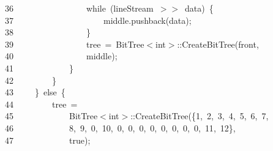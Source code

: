 \documentclass[11pt,a4paper]{ctexart}
\newcommand{\hlstd}[1]{\textcolor[rgb]{0.2,0.2,0.2}{#1}}
\newcommand{\hlnum}[1]{\textcolor[rgb]{0.06,0.58,0.63}{#1}}
\newcommand{\hlopt}[1]{\textcolor[rgb]{0.2,0.2,0.2}{#1}}
\newcommand{\hllin}[1]{\textcolor[rgb]{0.59,0.59,0.59}{#1}}
\newcommand{\hlkwa}[1]{\textcolor[rgb]{0.23,0.42,0.78}{#1}}
\newcommand{\hlkwb}[1]{\textcolor[rgb]{0.63,0,0.31}{#1}}
\newcommand{\hlkwd}[1]{\textcolor[rgb]{0.78,0.23,0.41}{#1}}
\begin{document}
\hllin{36\ }\hlstd{}\hlstd{\ \ \ \ \ \ \ \ \ \ \ \ \ \ \ \ }\hlstd{}\hlkwa{while\ }\hlstd{}\hlopt{(}\hlstd{lineStream\ }\hlopt{$>$$>$\ }\hlstd{data}\hlopt{)\ \{}\\
\hllin{37\ }\hlstd{}\hlstd{\ \ \ \ \ \ \ \ \ \ \ \ \ \ \ \ \ \ \ \ }\hlstd{middle}\hlopt{.}\hlstd{}\hlkwd{push\textunderscore back}\hlstd{}\hlopt{(}\hlstd{data}\hlopt{);}\\
\hllin{38\ }\hlstd{}\hlstd{\ \ \ \ \ \ \ \ \ \ \ \ \ \ \ \ }\hlstd{}\hlopt{\}}\\
\hllin{39\ }\hlstd{}\hlstd{\ \ \ \ \ \ \ \ \ \ \ \ \ \ \ \ }\hlstd{tree\ }\hlopt{=\ }\hlstd{BitTree}\hlopt{$<$}\hlstd{}\hlkwb{int}\hlstd{}\hlopt{$>$::}\hlstd{}\hlkwd{CreateBitTree}\hlstd{}\hlopt{(}\hlstd{front}\hlopt{,\ }\Righttorque\\
\hllin{40\ }\hlstd{}\hlstd{\ \ \ \ \ \ \ \ \ \ \ \ \ \ \ \ }\hlstd{middle}\hlopt{);}\\
\hllin{41\ }\hlstd{}\hlstd{\ \ \ \ \ \ \ \ \ \ \ \ }\hlstd{}\hlopt{\}}\\
\hllin{42\ }\hlstd{}\hlstd{\ \ \ \ \ \ \ \ }\hlstd{}\hlopt{\}}\\
\hllin{43\ }\hlstd{}\hlstd{\ \ \ \ }\hlstd{}\hlopt{\}\ }\hlstd{}\hlkwa{else\ }\hlstd{}\hlopt{\{}\\
\hllin{44\ }\hlstd{}\hlstd{\ \ \ \ \ \ \ \ }\hlstd{tree\ }\hlopt{=}\\
\hllin{45\ }\hlstd{}\hlstd{\ \ \ \ \ \ \ \ \ \ \ \ }\hlstd{BitTree}\hlopt{$<$}\hlstd{}\hlkwb{int}\hlstd{}\hlopt{$>$::}\hlstd{}\hlkwd{CreateBitTree}\hlstd{}\hlopt{(\{}\hlstd{}\hlnum{1}\hlstd{}\hlopt{,\ }\hlstd{}\hlnum{2}\hlstd{}\hlopt{,\ }\hlstd{}\hlnum{3}\hlstd{}\hlopt{,\ }\hlstd{}\hlnum{4}\hlstd{}\hlopt{,\ }\hlstd{}\hlnum{5}\hlstd{}\hlopt{,\ }\hlstd{}\hlnum{6}\hlstd{}\hlopt{,\ }\hlstd{}\hlnum{7}\hlstd{}\hlopt{,}\Righttorque\\
\hllin{46\ }\hlstd{}\hlstd{\ \ \ \ \ \ \ \ \ \ \ \ }\hlstd{}\hlnum{8}\hlstd{}\hlopt{,\ }\hlstd{}\hlnum{9}\hlstd{}\hlopt{,\ }\hlstd{}\hlnum{0}\hlstd{}\hlopt{,\ }\hlstd{}\hlnum{10}\hlstd{}\hlopt{,\ }\hlstd{}\hlnum{0}\hlstd{}\hlopt{,\ }\hlstd{}\hlnum{0}\hlstd{}\hlopt{,\ }\hlstd{}\hlnum{0}\hlstd{}\hlopt{,\ }\hlstd{}\hlnum{0}\hlstd{}\hlopt{,\ }\hlstd{}\hlnum{0}\hlstd{}\hlopt{,\ }\hlstd{}\hlnum{0}\hlstd{}\hlopt{,\ }\hlstd{}\hlnum{0}\hlstd{}\hlopt{,\ }\hlstd{}\hlnum{0}\hlstd{}\hlopt{,\ }\hlstd{}\hlnum{11}\hlstd{}\hlopt{,\ }\hlstd{}\hlnum{12}\hlstd{}\hlopt{\},\ }\Righttorque\\
\hllin{47\ }\hlstd{}\hlstd{\ \ \ \ \ \ \ \ \ \ \ \ }\hlstd{}\hlkwa{true}\hlstd{}\hlopt{);}\\
\end{document}
